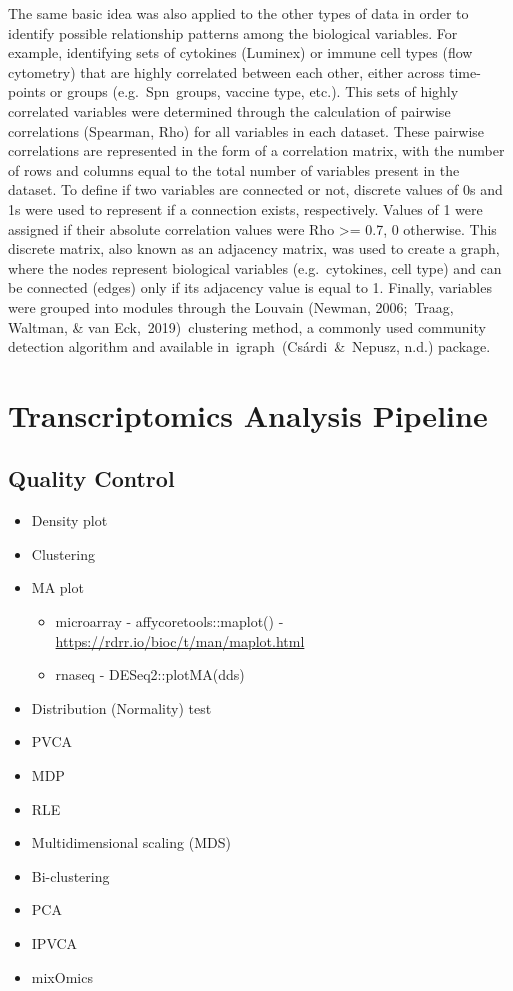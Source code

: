\documentclass[
]{book}
\begin{document}
The same basic idea was also applied to the other types of data in order to identify possible relationship patterns among the biological variables. For example, identifying sets of cytokines (Luminex) or immune cell types (flow cytometry) that are highly correlated between each other, either across time-points or groups (e.g.~Spn~groups, vaccine type, etc.). This sets of highly correlated variables were determined through the calculation of pairwise correlations (Spearman, Rho) for all variables in each dataset. These pairwise correlations are represented in the form of a correlation matrix, with the number of rows and columns equal to the total number of variables present in the dataset. To define if two variables are connected or not, discrete values of 0s and 1s were used to represent if a connection exists, respectively. Values of 1 were assigned if their absolute correlation values were \textbar Rho\textbar{} \textgreater= 0.7, 0 otherwise. This discrete matrix, also known as an adjacency matrix, was used to create a graph, where the nodes represent biological variables (e.g.~cytokines, cell type) and can be connected (edges) only if its adjacency value is equal to 1. Finally, variables were grouped into modules through the Louvain (Newman, 2006;~Traag, Waltman, \& van Eck,~2019)⁠~clustering method, a commonly used community detection algorithm and available in~igraph~(Csárdi~\&~Nepusz, n.d.)⁠ package.

\hypertarget{transcriptomics-analysis-pipeline}{%
\section{Transcriptomics Analysis Pipeline}\label{transcriptomics-analysis-pipeline}}

\hypertarget{quality-control}{%
\subsection{Quality Control}\label{quality-control}}

\begin{itemize}
\item
  Density plot
\item
  Clustering
\item
  MA plot

  \begin{itemize}
  \item
    microarray - affycoretools::maplot() - \url{https://rdrr.io/bioc/t/man/maplot.html}
  \item
    rnaseq - DESeq2::plotMA(dds)
  \end{itemize}
\item
  Distribution (Normality) test
\item
  PVCA
\item
  MDP
\item
  RLE
\item
  Multidimensional scaling (MDS)
\item
  Bi-clustering
\item
  PCA
\item
  IPVCA
\item
  mixOmics
\end{itemize}
\end{document}
